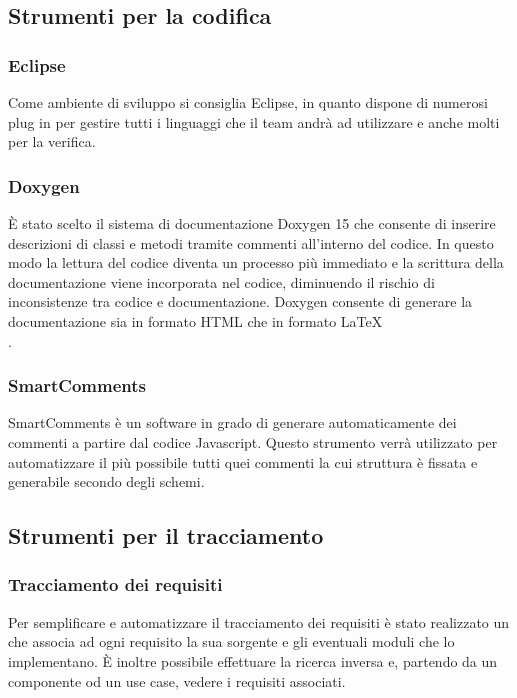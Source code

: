 \subsection{Strumenti per la codifica}
\subsubsection{Eclipse}
Come ambiente di sviluppo si consiglia Eclipse, in quanto dispone di numerosi plug in per gestire tutti i linguaggi che il team andrà ad utilizzare e anche molti per la verifica.

\subsubsection{Doxygen}
È stato scelto il sistema di documentazione Doxygen 15 che consente di inserire descrizioni di classi e metodi tramite commenti all’interno del codice. In questo modo la lettura del codice diventa un processo più immediato e la scrittura della documentazione viene incorporata nel codice, diminuendo il rischio di inconsistenze tra codice e 
documentazione. Doxygen consente di generare la documentazione sia in formato HTML che in formato \LaTeX\\.

\subsubsection{SmartComments}
SmartComments è un software in grado di generare automaticamente dei commenti a partire dal codice Javascript.
Questo strumento verrà utilizzato per automatizzare il più possibile tutti quei commenti la cui struttura è fissata e generabile secondo degli schemi.

\subsection{Strumenti per il tracciamento}

\subsubsection{Tracciamento dei requisiti}
\label{}
Per semplificare e automatizzare il tracciamento dei requisiti è stato realizzato un   che associa ad ogni requisito la sua sorgente e gli eventuali moduli che lo implementano. È inoltre possibile effettuare la ricerca inversa e, partendo da un componente od un use case, vedere i requisiti associati.

